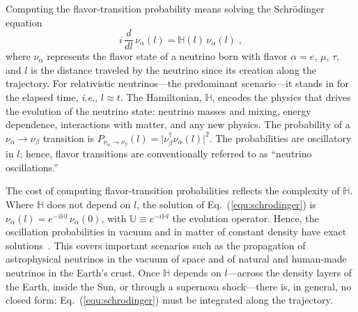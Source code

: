 \documentclass[final,5p,times,twocolumn,sort,compress]{elsarticle}
\makeatletter
\newcommand{\ie}{{\it i.e.}}
\newcommand{\eq}{Eq.}
\DeclareRobustCommand{\_}{%
  \ifmmode\nfss@text{\textunderscore}\else\textunderscore\allowbreak\fi}
\newcommand{\equ}[1]{\eq~(\ref{equ:#1})}
\makeatother
\begin{document}
Computing the flavor-transition probability means solving the Schr\"{o}dinger equation
\begin{equation}
 \label{equ:schrodinger}
 i\,\frac{d}{dl}\,\nu_\alpha(l) = \mathbb{H}(l)\,\nu_\alpha(l) \;,
\end{equation}
where $\nu_\alpha$ represents the flavor state of a neutrino born with flavor $\alpha = e$, $\mu$, $\tau$, and $l$ is the distance traveled by the neutrino since its creation along the trajectory. For relativistic neutrinos---the predominant scenario---it stands in for the elapsed time, \ie, $l \approx t$. The Hamiltonian, $\mathbb{H}$, encodes the physics that drives the evolution of the neutrino state: neutrino masses and mixing, energy dependence, interactions with matter, and any new physics.  The probability of a $\nu_\alpha \to \nu_\beta$ transition is $P_{\nu_\alpha \to \nu_\beta}(l) = \vert \nu_\beta^\dagger \nu_\alpha(l) \vert^2$. The probabilities are oscillatory in $l$; hence, flavor transitions are conventionally referred to as ``neutrino oscillations.''

The cost of computing flavor-transition probabilities reflects the complexity of $\mathbb{H}$. Where $\mathbb{H}$ does not depend on $l$, the solution of \equ{schrodinger} is $\nu_\alpha(l) = e^{-i \mathbb{H} l}\,\nu_\alpha(0)$, with $\mathbb{U} \equiv e^{-i \mathbb{H} l}$ the evolution operator. Hence, the oscillation probabilities in vacuum and in matter of constant density have exact solutions\ \cite{Bustamante:2019ggq, NuOscProbExact}. This covers important scenarios such as the propagation of astrophysical neutrinos in the vacuum of space and of natural and human-made neutrinos in the Earth's crust. Once $\mathbb{H}$ depends on $l$---across the density layers of the Earth, inside the Sun, or through a supernova shock---there is, in general, no closed form: \equ{schrodinger} must be integrated along the trajectory. 
\end{document}
